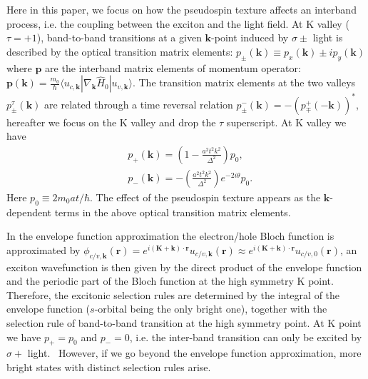 \documentclass[prb,twocolumn,amsmath,amssymb,superscriptaddress,showpacs]{revtex4}
\begin{document}
Here in this paper, we focus on how the pseudospin texture affects an interband process, i.e. the coupling between the exciton and the light field. At K valley ($\tau=+1$), band-to-band transitions at a given $\mathbf{k}$-point induced by $\sigma \pm$ light is described by the optical transition matrix elements: $p_{\pm}(\mathbf{k})\equiv p_{x}(\mathbf{k})\pm ip_{y}(\mathbf{k})$
where  $\mathbf p$ are the interband matrix elements of momentum operator: $\mathbf{p}(\mathbf{k})=\frac{m_0}{\hbar}\langle u_{c,\mathbf k}|\nabla_{\mathbf k}\hat{H}_0|u_{v,\mathbf k}\rangle$. The transition matrix elements at the two valleys $p_{\pm}^{\tau}(\mathbf{k})$ are related through a time reversal relation $p_{\pm}^{-}(\mathbf{k})=-(p_{\mp}^{+}(-\mathbf{k}))^{*}$, hereafter we focus on the K valley and drop the $\tau$ superscript. At K valley we have
\begin{subequations}
\label{MDFpcv}
\begin{align}
&p_{+}(\mathbf{k})=\left(1-\frac{a^{2}t^{2}k^{2}}{\Delta^{2}}\right)p_0, \label{MDFp+} \\
&p_{-}(\mathbf{k})=-\left(\frac{a^{2}t^{2}k^{2}}{\Delta^{2}}\right)e^{-2i\theta}p_0.
\label{MDFp-}
\end{align}
\end{subequations}
Here $p_0\equiv 2m_{0}at/\hbar$. The effect of the pseudospin texture appears as the $\mathbf k$-dependent terms in the above optical transition matrix elements.

In the envelope function approximation the electron/hole Bloch function is approximated by $\phi_{c/v,\mathbf{k}}(\mathbf r)=e^{i(\mathbf K+\mathbf k)\cdot\mathbf r}u_{c/v,\mathbf{k}}(\mathbf r)\approx e^{i(\mathbf K+\mathbf k)\cdot\mathbf r}u_{c/v,0}(\mathbf r)$, an exciton wavefunction is then given by the direct product of the envelope function and the periodic part of the Bloch function at the high symmetry K point. Therefore, the excitonic selection rules are determined by the integral of the envelope function ($s$-orbital being the only bright one), together with the selection rule of band-to-band transition at the high symmetry point. At K point we have $p_{+}=p_0$ and $p_{-}=0$, i.e. the inter-band transition can only be excited by $\sigma +$ light.~\cite{Yao Coupled Spin Valley 2012}
However, if we go beyond the envelope function approximation, more bright states with distinct selection rules arise.
\end{document}
